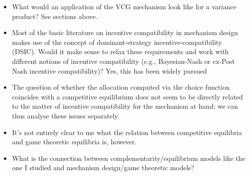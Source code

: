 \documentclass{article}
\begin{document}
\begin{itemize}
\item What would an application of the VCG mechanism look like for a variance product? See sections above.
\item Most of the basic literature on incentive compatibility in mechanism design makes use of the concept of dominant-strategy incentive-compatibility (DSIC). Would it make sense to relax these requirements and work with different notions of incentive compatibility (e.g., Bayesian-Nash or ex-Post Nash incentive compatibility)? Yes, this has been widely pursued
\item The question of whether the allocation computed via the choice function coincides with a competitive equilibrium does not seem to be directly related to the matter of incentive compatibility for the mechanism at hand: we can thus analyse these issues separately.
\item It's not entirely clear to me what the relation between competitive equilibria and game theoretic equilibria is, however.
\item What is the connection between complementarity/equilibrium models like the one I studied and mechanism design/game theoretic models?
\end{itemize}


\end{document}
